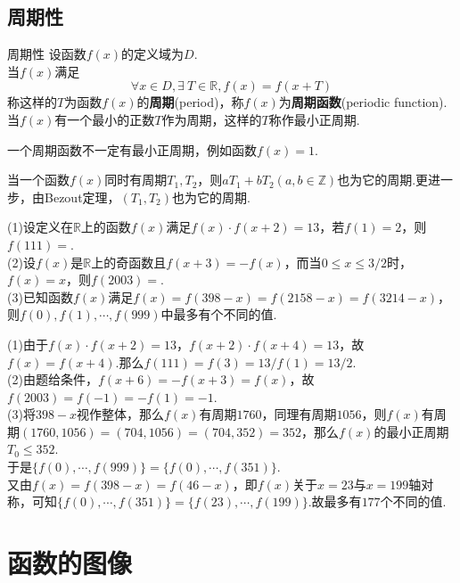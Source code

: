 \documentclass[lang=cn, zihao=5]{elegantbook}
\newcommand{\R}{\mathbb{R}}
\newcommand{\tk}{\uline{\hspace{4em}}}
\begin{document}
\newpage
\subsection{周期性}

\begin{definition}{周期性} %
    设函数$f(x)$的定义域为$D$.\\
    当$f(x)$满足$$\forall x \in D, \exists \ T \in \mathbb{R}, f(x)=f(x+T)$$
    称这样的$T$为函数$f(x)$的\textbf{周期}(period)，称$f(x)$为\textbf{周期函数}(periodic function).当$f(x)$有一个最小的正数$T$作为周期，这样的$T$称作最小正周期.
\end{definition}
\begin{remark}
    一个周期函数不一定有最小正周期，例如函数$f(x)=1$.
\end{remark}
\begin{remark}
    当一个函数$f(x)$同时有周期$T_1,T_2$，则$aT_1+bT_2(a,b \in \mathbb{Z})$也为它的周期.更进一步，由Bezout定理，$(T_1,T_2)$也为它的周期.
\end{remark}

\begin{example}
	(1)设定义在$\R$上的函数$f(x)$满足$f(x) \cdot f(x+2)=13$，若$f(1)=2$，则$f(111)=$\tk . \\
	(2)设$f(x)$是$\R$上的奇函数且$f(x+3)=-f(x)$，而当$0 \leq x \leq 3/2$时，$f(x)=x$，则$f(2003)=$\tk . \\
	(3)已知函数$f(x)$满足$f(x)=f(398-x)=f(2158-x)=f(3214-x)$，则$f(0),f(1),\cdots ,f(999)$中最多有\tk 个不同的值.
\end{example}
\begin{solution}
	(1)由于$f(x) \cdot f(x+2)=13$，$f(x+2) \cdot f(x+4)=13$，故$f(x)=f(x+4)$.那么$f(111)=f(3)=13/f(1)=13/2$. \\
	(2)由题给条件，$f(x+6)=-f(x+3)=f(x)$，故$f(2003)=f(-1)=-f(1)=-1$. \\
	(3)将$398-x$视作整体，那么$f(x)$有周期$1760$，同理有周期$1056$，则$f(x)$有周期$(1760,1056)=(704,1056)=(704,352)=352$，那么$f(x)$的最小正周期$T_0 \leq 352$. \\
	于是$\{ f(0),\cdots ,f(999) \} = \{ f(0),\cdots ,f(351) \}$. \\
	又由$f(x)=f(398-x)=f(46-x)$，即$f(x)$关于$x=23$与$x=199$轴对称，可知$\{ f(0),\cdots ,f(351) \} = \{ f(23),\cdots ,f(199) \}$.故最多有$177$个不同的值.
\end{solution}

\newpage
\section{函数的图像}
\end{document}
